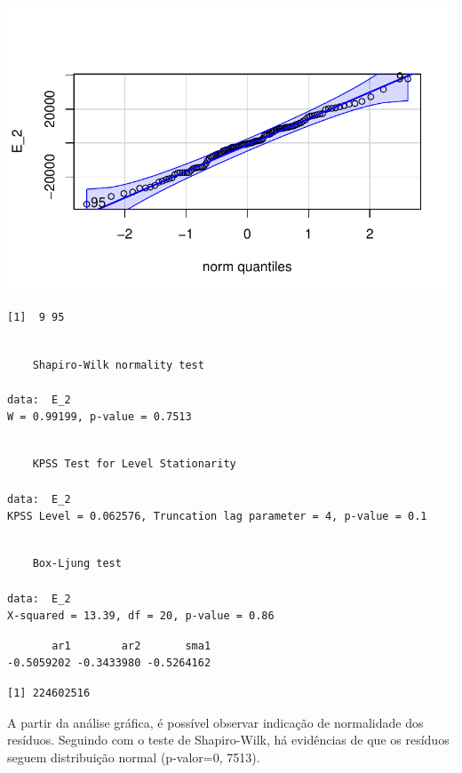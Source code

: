 \documentclass[
  letterpaper,
  DIV=11,
  numbers=noendperiod]{scrartcl}
\begin{document}
\includegraphics{T2_grupo10_files/figure-pdf/unnamed-chunk-10-2.pdf}

\begin{verbatim}
[1]  9 95
\end{verbatim}

\begin{verbatim}

    Shapiro-Wilk normality test

data:  E_2
W = 0.99199, p-value = 0.7513
\end{verbatim}

\begin{verbatim}

    KPSS Test for Level Stationarity

data:  E_2
KPSS Level = 0.062576, Truncation lag parameter = 4, p-value = 0.1
\end{verbatim}

\begin{verbatim}

    Box-Ljung test

data:  E_2
X-squared = 13.39, df = 20, p-value = 0.86
\end{verbatim}

\begin{verbatim}
       ar1        ar2       sma1 
-0.5059202 -0.3433980 -0.5264162 
\end{verbatim}

\begin{verbatim}
[1] 224602516
\end{verbatim}

A partir da análise gráfica, é possível observar indicação de
normalidade dos resíduos. Seguindo com o teste de Shapiro-Wilk, há
evidências de que os resíduos seguem distribuição normal (p-valor=0,
7513).
\end{document}
